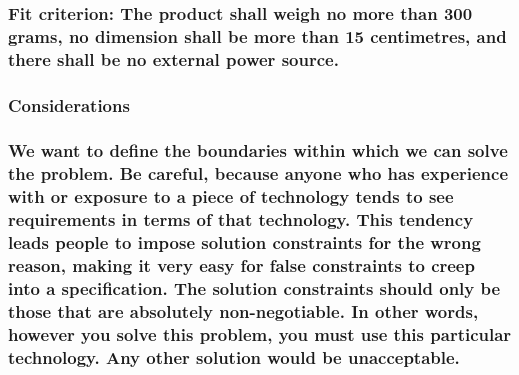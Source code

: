 \documentclass[
]{article}
\begin{document}
\hypertarget{fit-criterion-the-product-shall-weigh-no-more-than-300-grams-no-dimension-shall-be-more-than-15-centimetres-and-there-shall-be-no-external-power-source.}{%
\subsubsection{\texorpdfstring{Fit criterion: The product shall weigh no
more than 300 grams, no dimension shall be more than 15 centimetres, and
there shall be no external power source.
}{Fit criterion: The product shall weigh no more than 300 grams, no dimension shall be more than 15 centimetres, and there shall be no external power source. }}\label{fit-criterion-the-product-shall-weigh-no-more-than-300-grams-no-dimension-shall-be-more-than-15-centimetres-and-there-shall-be-no-external-power-source.}}

\hypertarget{considerations-2}{%
\subsubsection{Considerations}\label{considerations-2}}

\hypertarget{we-want-to-define-the-boundaries-within-which-we-can-solve-the-problem.-be-careful-because-anyone-who-has-experience-with-or-exposure-to-a-piece-of-technology-tends-to-see-requirements-in-terms-of-that-technology.-this-tendency-leads-people-to-impose-solution-constraints-for-the-wrong-reason-making-it-very-easy-for-false-constraints-to-creep-into-a-specification.-the-solution-constraints-should-only-be-those-that-are-absolutely-non-negotiable.-in-other-words-however-you-solve-this-problem-you-must-use-this-particular-technology.-any-other-solution-would-be-unacceptable.}{%
\subsubsection{We want to define the boundaries within which we can
solve the problem. Be careful, because anyone who has experience with or
exposure to a piece of technology tends to see requirements in terms of
that technology. This tendency leads people to impose solution
constraints for the wrong reason, making it very easy for false
constraints to creep into a specification. The solution constraints
should only be those that are absolutely non-negotiable. In other words,
however you solve this problem, you must use this particular technology.
Any other solution would be
unacceptable.}\label{we-want-to-define-the-boundaries-within-which-we-can-solve-the-problem.-be-careful-because-anyone-who-has-experience-with-or-exposure-to-a-piece-of-technology-tends-to-see-requirements-in-terms-of-that-technology.-this-tendency-leads-people-to-impose-solution-constraints-for-the-wrong-reason-making-it-very-easy-for-false-constraints-to-creep-into-a-specification.-the-solution-constraints-should-only-be-those-that-are-absolutely-non-negotiable.-in-other-words-however-you-solve-this-problem-you-must-use-this-particular-technology.-any-other-solution-would-be-unacceptable.}}
\end{document}
